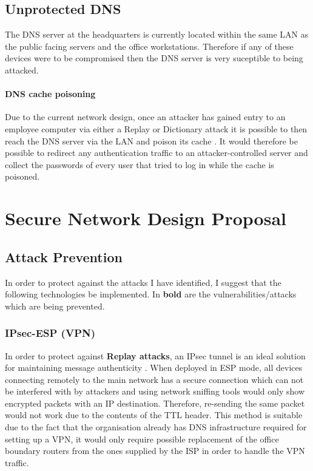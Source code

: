 \documentclass[11pt]{article}
\begin{document}
    \subsection{Unprotected DNS}
      The DNS server at the headquarters is currently located within the same LAN as the public facing servers and the office workstations. Therefore if any of these devices were to be compromised then the DNS server is very suceptible to being attacked.

      \paragraph{DNS cache poisoning}
        Due to the current network design, once an attacker has gained entry to an employee computer via either a Replay or Dictionary attack it is possible to then reach the DNS server via the LAN and poison its cache \citep{son2010hitchhiker}. It would therefore be possible to redirect any authentication traffic to an attacker-controlled server and collect the passwords of every user that tried to log in while the cache is poisoned.

    \section{Secure Network Design Proposal}
      \subsection{Attack Prevention}
        In order to protect against the attacks I have identified, I suggest that the following technologies be implemented. In \textbf{bold} are the vulnerabilities/attacks which are being prevented.

        \subsubsection{IPsec-ESP (VPN)} \label{ipsec}
          In order to protect against \textbf{Replay attacks}, an IPsec tunnel is an ideal solution for maintaining message authenticity \citep{ncsc2016IPSec}. When deployed in ESP mode, all devices connecting remotely to the main network has a secure connection which can not be interfered with by attackers and using network sniffing tools would only show encrypted packets with an IP destination. Therefore, re-sending the same packet would not work due to the contents of the TTL header. This method is suitable due to the fact that the organisation already has DNS infrastructure required for setting up a VPN, it would only require possible replacement of the office boundary routers from the ones supplied by the ISP in order to handle the VPN traffic.
\end{document}
